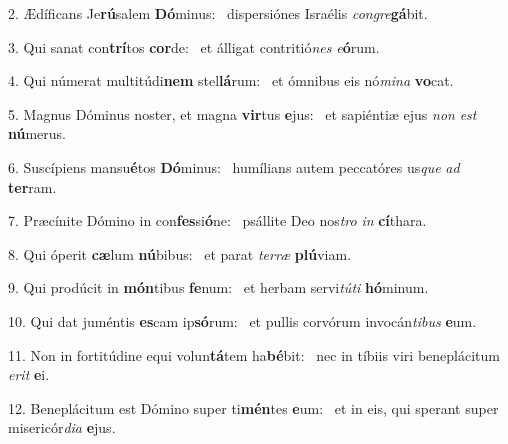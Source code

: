 2. Ædíficans Je\textbf{rú}salem \textbf{Dó}minus: \ast\  dispersiónes Israélis \textit{con}\textit{gre}\textbf{gá}bit.\

3. Qui sanat con\textbf{trí}tos \textbf{cor}de: \ast\  et álligat contritió\textit{nes} \textit{e}\textbf{ó}rum.\

4. Qui númerat multitúdi\textbf{nem} stel\textbf{lá}rum: \ast\  et ómnibus eis nó\textit{mi}\textit{na} \textbf{vo}cat.\

5. Magnus Dóminus noster, et magna \textbf{vir}tus \textbf{e}jus: \ast\  et sapiéntiæ ejus \textit{non} \textit{est} \textbf{nú}merus.\

6. Suscípiens mansu\textbf{é}tos \textbf{Dó}minus: \ast\  humílians autem peccatóres us\textit{que} \textit{ad} \textbf{ter}ram.\

7. Præcínite Dómino in con\textbf{fes}si\textbf{ó}ne: \ast\  psállite Deo nos\textit{tro} \textit{in} \textbf{cí}thara.\

8. Qui óperit \textbf{cæ}lum \textbf{nú}bibus: \ast\  et parat \textit{ter}\textit{ræ} \textbf{plú}viam.\

9. Qui prodúcit in \textbf{món}tibus \textbf{fe}num: \ast\  et herbam servi\textit{tú}\textit{ti} \textbf{hó}minum.\

10. Qui dat juméntis \textbf{es}cam ip\textbf{só}rum: \ast\  et pullis corvórum invocán\textit{ti}\textit{bus} \textbf{e}um.\

11. Non in fortitúdine equi volun\textbf{tá}tem ha\textbf{bé}bit: \ast\  nec in tíbiis viri beneplácitum \textit{e}\textit{rit} \textbf{e}i.\

12. Beneplácitum est Dómino super ti\textbf{mén}tes \textbf{e}um: \ast\  et in eis, qui sperant super misericór\textit{di}\textit{a} \textbf{e}jus.\

